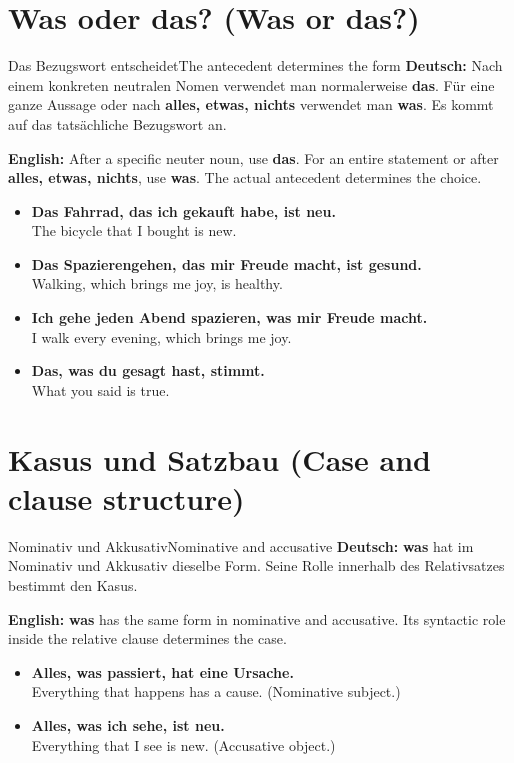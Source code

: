 \documentclass[a4paper,11pt]{article}
\newcommand{\GermanText}[1]{\textbf{Deutsch: }#1\par}
\newcommand{\EnglishText}[1]{{\small\color{SoftGray}\textbf{English: }#1\par}}
\newcommand{\ExampleItem}[2]{\item \textbf{#1}\\{\small\color{SoftGray}#2}}
\begin{document}
   \section{Was oder das? (Was or das?)}
               \begin{grammarentry}{Das Bezugswort entscheidet}{The antecedent determines the form}
                  \GermanText{Nach einem konkreten neutralen Nomen verwendet man normalerweise \textbf{das}. Für eine ganze Aussage oder nach \textbf{alles, etwas, nichts} verwendet man \textbf{was}. Es kommt auf das tatsächliche Bezugswort an.}
                  \EnglishText{After a specific neuter noun, use \textbf{das}. For an entire statement or after \textbf{alles, etwas, nichts}, use \textbf{was}. The actual antecedent determines the choice.}
               \end{grammarentry}
               \begin{exbox}\begin{itemize}
                  \ExampleItem{Das Fahrrad, das ich gekauft habe, ist neu.}{The bicycle that I bought is new.}
                  \ExampleItem{Das Spazierengehen, das mir Freude macht, ist gesund.}{Walking, which brings me joy, is healthy.}
                  \ExampleItem{Ich gehe jeden Abend spazieren, was mir Freude macht.}{I walk every evening, which brings me joy.}
                  \ExampleItem{Das, was du gesagt hast, stimmt.}{What you said is true.}
                  \end{itemize}\end{exbox}
   \section{Kasus und Satzbau (Case and clause structure)}
                  \begin{grammarentry}{Nominativ und Akkusativ}{Nominative and accusative}
                     \GermanText{\textbf{was} hat im Nominativ und Akkusativ dieselbe Form. Seine Rolle innerhalb des Relativsatzes bestimmt den Kasus.}
                     \EnglishText{\textbf{was} has the same form in nominative and accusative. Its syntactic role inside the relative clause determines the case.}
                  \end{grammarentry}
                  \begin{exbox}\begin{itemize}
                     \ExampleItem{Alles, was passiert, hat eine Ursache.}{Everything that happens has a cause. (Nominative subject.)}
                     \ExampleItem{Alles, was ich sehe, ist neu.}{Everything that I see is new. (Accusative object.)}
                     \end{itemize}\end{exbox}
\end{document}
